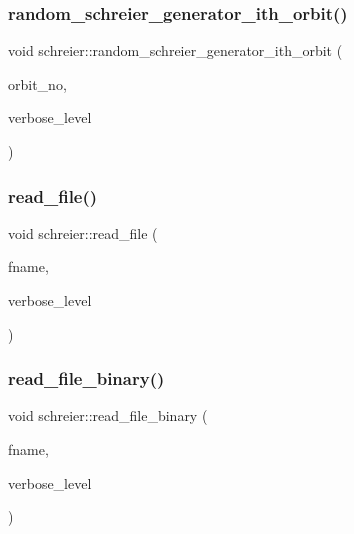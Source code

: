 \mbox{\label{classschreier_a285786eaa8f7e8d50d59c2335c549044}} 
\subsubsection{\texorpdfstring{random\+\_\+schreier\+\_\+generator\+\_\+ith\+\_\+orbit()}{random\_schreier\_generator\_ith\_orbit()}}
{\footnotesize\ttfamily void schreier\+::random\+\_\+schreier\+\_\+generator\+\_\+ith\+\_\+orbit (\begin{DoxyParamCaption}\item[{\mbox{\hyperlink{galois_8h_a09fddde158a3a20bd2dcadb609de11dc}{I\+NT}}}]{orbit\+\_\+no,  }\item[{\mbox{\hyperlink{galois_8h_a09fddde158a3a20bd2dcadb609de11dc}{I\+NT}}}]{verbose\+\_\+level }\end{DoxyParamCaption})}

\mbox{\label{classschreier_aceec223ba035fba0702ee8f7877abe97}} 
\subsubsection{\texorpdfstring{read\+\_\+file()}{read\_file()}}
{\footnotesize\ttfamily void schreier\+::read\+\_\+file (\begin{DoxyParamCaption}\item[{const \mbox{\hyperlink{galois_8h_ab6cc7b4aeb6ea31aba2b3fbfc83ff5e6}{B\+Y\+TE}} $\ast$}]{fname,  }\item[{\mbox{\hyperlink{galois_8h_a09fddde158a3a20bd2dcadb609de11dc}{I\+NT}}}]{verbose\+\_\+level }\end{DoxyParamCaption})}

\mbox{\label{classschreier_abd32d044d2691866632d246bd5b9c3d4}} 
\subsubsection{\texorpdfstring{read\+\_\+file\+\_\+binary()}{read\_file\_binary()}}
{\footnotesize\ttfamily void schreier\+::read\+\_\+file\+\_\+binary (\begin{DoxyParamCaption}\item[{const \mbox{\hyperlink{galois_8h_ab6cc7b4aeb6ea31aba2b3fbfc83ff5e6}{B\+Y\+TE}} $\ast$}]{fname,  }\item[{\mbox{\hyperlink{galois_8h_a09fddde158a3a20bd2dcadb609de11dc}{I\+NT}}}]{verbose\+\_\+level }\end{DoxyParamCaption})}

